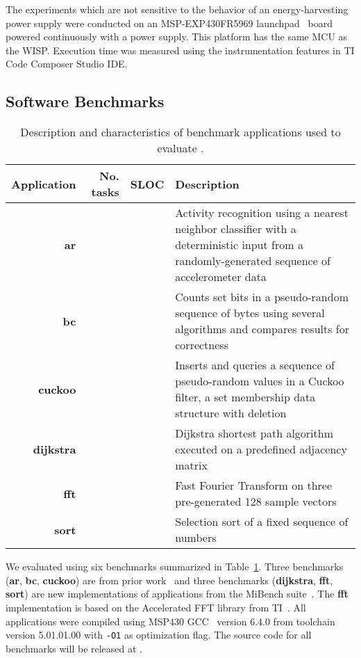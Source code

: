 The experiments which are not sensitive to the behavior of an
energy-harvesting power supply were conducted on an MSP-EXP430FR5969
launchpad~\cite{MSP-EXP430FR5969_launchpad} board powered continuously with a
power supply.
%
This platform has the same MCU as the WISP.
%
Execution time was measured using the instrumentation features in TI Code
Composer Studio IDE.
%

\subsection{Software Benchmarks}
\label{sec:software_benchmarks}

\begin{table}
	\centering
	\footnotesize
	\begin{tabular}{| r|r|r | p{} |}
		\hline
		Application & No. tasks & SLOC & Description \\
		\hline\hline
        \textbf{ar} & & & Activity recognition using a nearest neighbor
classifier with a deterministic input from a randomly-generated sequence of
accelerometer data\\
		\hline
        \textbf{bc} & & & Counts set bits in a pseudo-random sequence of bytes
using several algorithms and compares results for correctness\\
		\hline
        \textbf{cuckoo} & & & Inserts and queries a sequence of pseudo-random
values in a Cuckoo filter, a set membership data structure with deletion\\
		\hline
        \textbf{dijkstra} &  & & Dijkstra shortest path algorithm executed on a
predefined adjacency matrix\\
		\hline
        \textbf{fft} & & & Fast Fourier Transform on three pre-generated 128
sample vectors\\
		\hline
		\textbf{sort} & & & Selection sort of a fixed sequence of numbers\\
		\hline
	\end{tabular}
\caption{Description and characteristics of benchmark applications used to
evaluate \sys. }
\label{table:benchmark_table}
\end{table}

We evaluated \sys using six benchmarks summarized in
Table~\ref{table:benchmark_table}. %
Three benchmarks (\textbf{ar}, \textbf{bc}, \textbf{cuckoo}) are from prior
work~\cite{chain,alpaca} and three benchmarks (\textbf{dijkstra},
\textbf{fft}, \textbf{sort}) are new implementations of applications
from the MiBench suite~\cite{mibench,hicks_mibench2_2016}. The
\textbf{fft} implementation is based on the Accelerated FFT library from
TI~\cite{ti_dsp}. All applications were compiled using MSP430 GCC~\cite{ti-gcc} version 6.4.0
from toolchain version 5.01.01.00 with \texttt{-O1} as optimization flag.
%
The source code for all benchmarks will be released at \cite{coala_website}.


